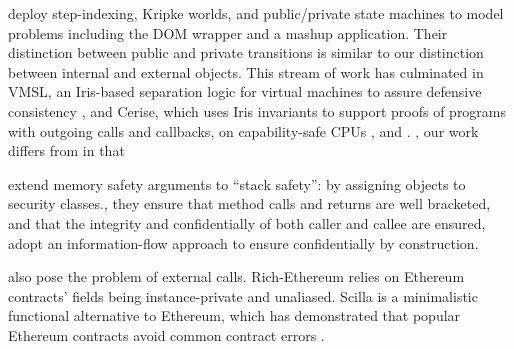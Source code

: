 \citet{dd} deploy step-indexing, Kripke worlds, and %
  public/private state machines to model problems including the 
DOM wrapper and a mashup application.
Their distinction between public and private transitions %
is similar  to our
distinction between internal and external objects.
This stream of work has culminated in VMSL, an Iris-based separation logic for
virtual machines to assure defensive consistency
\cite{vmsl-pldi2023},
%
%
and Cerise, which uses Iris invariants to support proofs of programs with outgoing calls and callbacks,
on capability-safe CPUs \cite{cerise-jacm2024},
and .
, our work differs from
in that 
%

{\citet{stack-safety-csf2023} extend memory safety} arguments to ``stack
safety'': by assigning objects to security
classes., they ensure that method calls and returns are well bracketed,
and that the integrity and confidentially of both
caller and callee are ensured, 
{\citet{schaeferCbC}    adopt}
an information-flow approach to ensure confidentially by construction.
 

 also pose the problem of external calls.
Rich-Ethereum \cite{rich-specs-smart-contracts-oopsla2021}
relies on Ethereum contracts' fields being instance-private
and unaliased. %
Scilla \cite{sergey-scilla-oopsla2019}
is a minimalistic functional alternative to Ethereum,
which has demonstrated that popular Ethereum
contracts avoid common contract errors .
%


